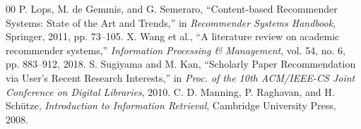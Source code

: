 \documentclass[conference]{IEEEtran}
\begin{document}
\begin{thebibliography}{00}
 P. Lops, M. de Gemmis, and G. Semeraro, ``Content-based Recommender Systems: State of the Art and Trends,'' in \textit{Recommender Systems Handbook}, Springer, 2011, pp. 73--105.
 X. Wang et al., ``A literature review on academic recommender systems,'' \textit{Information Processing \& Management}, vol. 54, no. 6, pp. 883--912, 2018.
 S. Sugiyama and M. Kan, ``Scholarly Paper Recommendation via User's Recent Research Interests,'' in \textit{Proc. of the 10th ACM/IEEE-CS Joint Conference on Digital Libraries}, 2010.
 C. D. Manning, P. Raghavan, and H. Sch\"utze, \textit{Introduction to Information Retrieval}, Cambridge University Press, 2008.
\end{thebibliography}
\end{document}

